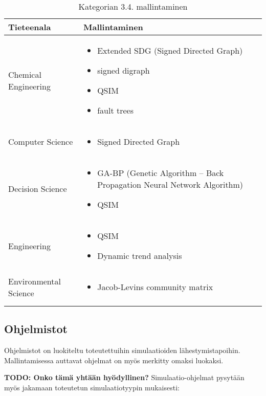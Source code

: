 \documentclass[utf8]{gradu3}
\begin{document}
\begin{longtable}[h]{|p{5cm}|p{8cm}|}
    \hline
    \textbf{Tieteenala}    &    \textbf{Mallintaminen}\\
    \hline
    Chemical Engineering & \begin{itemize}
        \item Extended SDG (Signed Directed Graph)
        \item signed digraph
        \item QSIM
        \item fault trees
    \end{itemize} \\
    \hline
    Computer Science & \begin{itemize}
        \item Signed Directed Graph
    \end{itemize} \\
    \hline
    Decision Science & \begin{itemize}
        \item GA-BP (Genetic Algorithm – Back Propagation Neural Network Algorithm)
        \item QSIM
    \end{itemize} \\
    \hline
    Engineering & \begin{itemize}
        \item QSIM
        \item Dynamic trend analysis
    \end{itemize} \\
    \hline
    Environmental Science & \begin{itemize}
        \item Jacob-Levins community matrix
    \end{itemize} \\
    \hline
    \caption{Kategorian 3.4. mallintaminen}
    \label{table:Kategorian 3.4. mallintaminen}
\end{longtable}


\subsection{Ohjelmistot}
Ohjelmistot on luokiteltu toteutettuihin simulaatioiden lähestymistapoihin. Mallintamisessa auttavat ohjelmat on myös merkitty omaksi luokaksi.

\textbf{TODO: Onko tämä yhtään hyödyllinen?}
Simulaatio-ohjelmat pysytään myös jakamaan toteutetun simulaatiotyypin mukaisesti:
\end{document}
